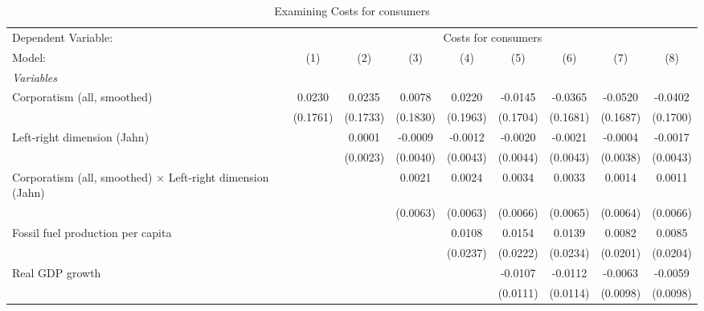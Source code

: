 
\begin{table}[htbp]
   \caption{Examining Costs for consumers}
   \centering
   \begin{tabular}{lcccccccc}
      \tabularnewline \midrule \midrule
      Dependent Variable: & \multicolumn{8}{c}{Costs for consumers}\\
      Model:                                                            & (1)      & (2)      & (3)      & (4)      & (5)      & (6)      & (7)      & (8)\\  
      \midrule
      \emph{Variables}\\
      Corporatism (all, smoothed)                                       & 0.0230   & 0.0235   & 0.0078   & 0.0220   & -0.0145  & -0.0365  & -0.0520  & -0.0402\\   
                                                                        & (0.1761) & (0.1733) & (0.1830) & (0.1963) & (0.1704) & (0.1681) & (0.1687) & (0.1700)\\   
      Left-right dimension (Jahn)                                       &          & 0.0001   & -0.0009  & -0.0012  & -0.0020  & -0.0021  & -0.0004  & -0.0017\\   
                                                                        &          & (0.0023) & (0.0040) & (0.0043) & (0.0044) & (0.0043) & (0.0038) & (0.0043)\\   
      Corporatism (all, smoothed) $\times$ Left-right dimension (Jahn)  &          &          & 0.0021   & 0.0024   & 0.0034   & 0.0033   & 0.0014   & 0.0011\\   
                                                                        &          &          & (0.0063) & (0.0063) & (0.0066) & (0.0065) & (0.0064) & (0.0066)\\   
      Fossil fuel production per capita                                 &          &          &          & 0.0108   & 0.0154   & 0.0139   & 0.0082   & 0.0085\\   
                                                                        &          &          &          & (0.0237) & (0.0222) & (0.0234) & (0.0201) & (0.0204)\\   
      Real GDP growth                                                   &          &          &          &          & -0.0107  & -0.0112  & -0.0063  & -0.0059\\   
                                                                        &          &          &          &          & (0.0111) & (0.0114) & (0.0098) & (0.0098)\\   

\end{tabular}
\end{table}
